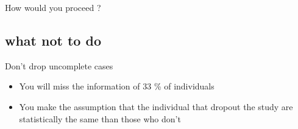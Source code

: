 \documentclass{beamer}
\begin{document}
\begin{frame}
\end{frame}

\begin{frame}
\end{frame}



\begin{frame}
\Large How would you proceed ?	
\end{frame}


\subsection{what not to do}
\begin{frame}
Don't drop uncomplete cases
	\begin{itemize}
        \item You will miss the information of 33 \% of individuals 
        \item You make the assumption that the individual that dropout the study are statistically the same than those who don't
	\end{itemize}
\end{frame}
\end{document}

